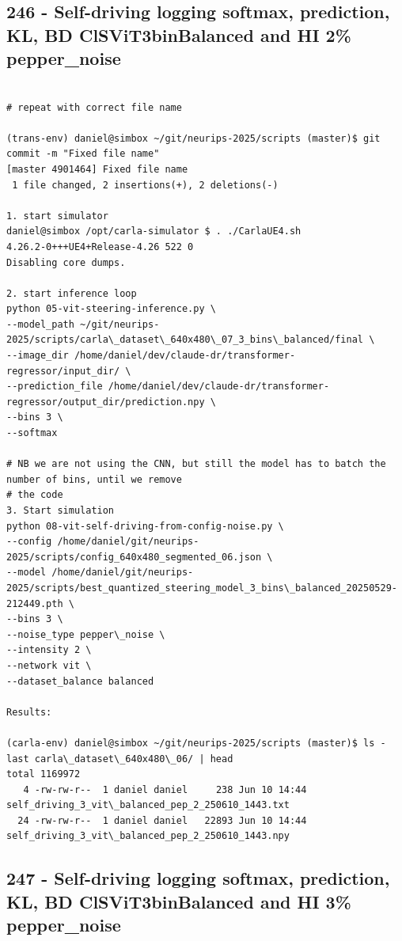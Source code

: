 \subsection{246 - Self-driving logging softmax, prediction, KL, BD ClSViT3binBalanced and HI 2\% pepper\_noise}
\label{app_res:246}
\begin{verbatim}

# repeat with correct file name

(trans-env) daniel@simbox ~/git/neurips-2025/scripts (master)$ git commit -m "Fixed file name"
[master 4901464] Fixed file name
 1 file changed, 2 insertions(+), 2 deletions(-)
 
1. start simulator
daniel@simbox /opt/carla-simulator $ . ./CarlaUE4.sh 
4.26.2-0+++UE4+Release-4.26 522 0
Disabling core dumps.

2. start inference loop
python 05-vit-steering-inference.py \
--model_path ~/git/neurips-2025/scripts/carla\_dataset\_640x480\_07_3_bins\_balanced/final \
--image_dir /home/daniel/dev/claude-dr/transformer-regressor/input_dir/ \
--prediction_file /home/daniel/dev/claude-dr/transformer-regressor/output_dir/prediction.npy \
--bins 3 \
--softmax

# NB we are not using the CNN, but still the model has to batch the number of bins, until we remove
# the code
3. Start simulation
python 08-vit-self-driving-from-config-noise.py \
--config /home/daniel/git/neurips-2025/scripts/config_640x480_segmented_06.json \
--model /home/daniel/git/neurips-2025/scripts/best_quantized_steering_model_3_bins\_balanced_20250529-212449.pth \
--bins 3 \
--noise_type pepper\_noise \
--intensity 2 \
--network vit \
--dataset_balance balanced

Results:

(carla-env) daniel@simbox ~/git/neurips-2025/scripts (master)$ ls -last carla\_dataset\_640x480\_06/ | head
total 1169972
   4 -rw-rw-r--  1 daniel daniel     238 Jun 10 14:44 self_driving_3_vit\_balanced_pep_2_250610_1443.txt
  24 -rw-rw-r--  1 daniel daniel   22893 Jun 10 14:44 self_driving_3_vit\_balanced_pep_2_250610_1443.npy

\end{verbatim}

\subsection{247 - Self-driving logging softmax, prediction, KL, BD ClSViT3binBalanced and HI 3\% pepper\_noise}
\label{app_res:247}

